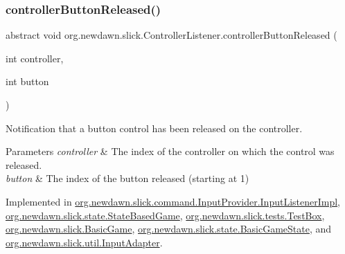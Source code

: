 \mbox{\label{interfaceorg_1_1newdawn_1_1slick_1_1_controller_listener_a34020453a6c40e12b149c334a4adc246}} 
\subsubsection{\texorpdfstring{controller\+Button\+Released()}{controllerButtonReleased()}}
{\footnotesize\ttfamily abstract void org.\+newdawn.\+slick.\+Controller\+Listener.\+controller\+Button\+Released (\begin{DoxyParamCaption}\item[{int}]{controller,  }\item[{int}]{button }\end{DoxyParamCaption})\hspace{0.3cm}{\ttfamily [abstract]}}

Notification that a button control has been released on the controller.


\begin{DoxyParams}{Parameters}
{\em controller} & The index of the controller on which the control was released. \\
\hline
{\em button} & The index of the button released (starting at 1) \\
\hline
\end{DoxyParams}


Implemented in \mbox{\hyperlink{classorg_1_1newdawn_1_1slick_1_1command_1_1_input_provider_1_1_input_listener_impl_a32ba61e40693153639ad65623c4e9f4c}{org.\+newdawn.\+slick.\+command.\+Input\+Provider.\+Input\+Listener\+Impl}}, \mbox{\hyperlink{classorg_1_1newdawn_1_1slick_1_1state_1_1_state_based_game_a83c8be949774abfd63a5837422c6f8fc}{org.\+newdawn.\+slick.\+state.\+State\+Based\+Game}}, \mbox{\hyperlink{classorg_1_1newdawn_1_1slick_1_1tests_1_1_test_box_a86db5c38f8964e3e401bc42b60562a42}{org.\+newdawn.\+slick.\+tests.\+Test\+Box}}, \mbox{\hyperlink{classorg_1_1newdawn_1_1slick_1_1_basic_game_ad979755eccbdc2959289f001b2c26bda}{org.\+newdawn.\+slick.\+Basic\+Game}}, \mbox{\hyperlink{classorg_1_1newdawn_1_1slick_1_1state_1_1_basic_game_state_a46c12ac651bb0a6d442068b3b448b9c1}{org.\+newdawn.\+slick.\+state.\+Basic\+Game\+State}}, and \mbox{\hyperlink{classorg_1_1newdawn_1_1slick_1_1util_1_1_input_adapter_ab67126cbafdf4803d88270e945553019}{org.\+newdawn.\+slick.\+util.\+Input\+Adapter}}.

